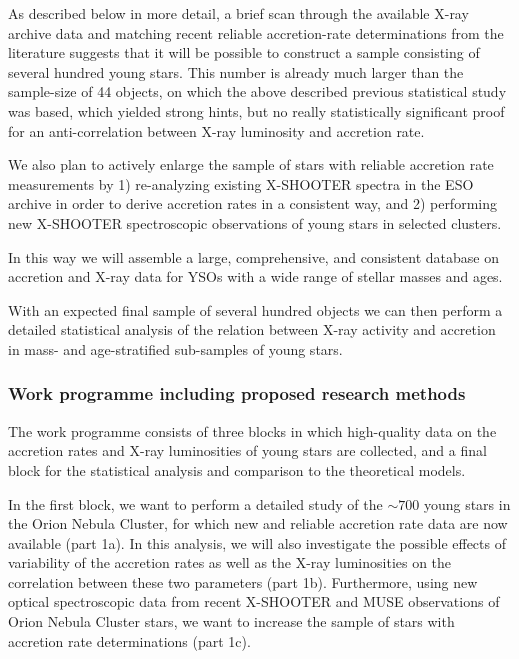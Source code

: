 \documentclass[10pt,fleqn,twoside]{article}
\begin{document}
\medskip


As described below in more detail, a brief scan through
the available X-ray archive data and matching recent
reliable accretion-rate determinations from the literature
suggests that
it will be possible to construct a sample consisting of several
hundred
young stars.
This number is already much larger than the sample-size of 44
objects, on which the above described previous statistical 
study was based, which yielded strong hints, but no really 
statistically significant proof for an 
anti-correlation between X-ray luminosity and accretion rate.


We also plan to actively enlarge the sample of stars with 
reliable accretion rate measurements by 
%
1) re-analyzing existing X-SHOOTER spectra in the ESO archive
in order to derive accretion rates in a consistent way, and
%
2) performing new X-SHOOTER spectroscopic 
observations of young stars in selected clusters.

\begin{highlight}
In this way we will assemble a large, comprehensive, and consistent
database on accretion and X-ray data for YSOs with a wide range of
stellar masses and ages.
\end{highlight}
%
With an expected final sample of several hundred objects we can then perform a
 detailed statistical analysis
of the relation between X-ray activity and accretion in mass- and 
age-stratified sub-samples of young stars. 

\subsubsection{Work programme including proposed research methods}

The work programme consists of three blocks in which high-quality data
on the accretion rates and X-ray luminosities of young stars are collected,
and a final block for the statistical analysis and
comparison to the theoretical models.

In the first block, we want to perform a detailed study
of the $\sim 700$ young stars in the Orion Nebula Cluster, for which
 new and reliable  accretion rate data are now available (part 1a).
%
In this analysis, we will also investigate the possible effects of variability
of the accretion rates as well as the X-ray luminosities
on the correlation between these two parameters (part 1b).
%
Furthermore, using new optical spectroscopic data from recent X-SHOOTER 
and MUSE observations of Orion Nebula Cluster stars,
we want to increase the sample of stars with accretion rate
determinations (part 1c).
\medskip
\end{document}
